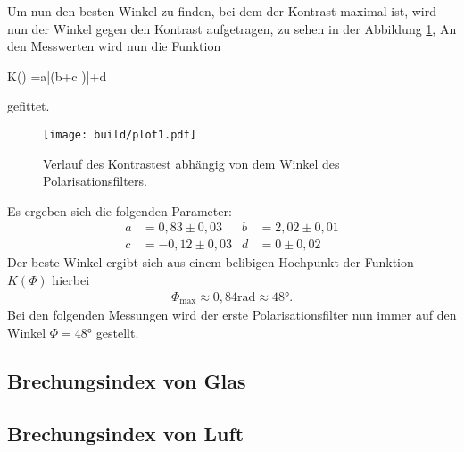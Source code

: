 Um nun den besten Winkel zu finden, bei dem der Kontrast maximal ist, wird
nun der Winkel gegen den Kontrast aufgetragen, zu sehen in der Abbildung \ref{fig:kontrast},
An den Messwerten wird nun die Funktion
\begin{algin}
  K\left(\Phi\right) =a\cdot \left|\sin\left(b\codt\Phi+c \right)\right|+d
\end{algin}
gefittet.

\begin{figure}
    \centering
    \texttt{[image: build/plot1.pdf]}
    \caption{Verlauf des Kontrastest abhängig von dem Winkel des Polarisationsfilters.}
    \label{fig:kontrast}
\end{figure}

Es ergeben sich die folgenden Parameter:
\begin{align*}
  a&=0,83\pm0,03
  &b&=2,02\pm0,01\\
  c&=-0,12\pm0,03
  &d&=0\pm0,02
\end{align*}
Der beste Winkel ergibt sich aus einem belibigen
Hochpunkt der Funktion $K(\Phi)$ hierbei
\begin{align*}
 \Phi_\mathrm{max}\approx0,84\si{\radian}\approx48\si{\degree}.
\end{align*}
Bei den folgenden Messungen wird der erste Polarisationsfilter
nun immer auf den Winkel $\Phi=48\si{\degree}$ gestellt.
\subsection{Brechungsindex von Glas}



\subsection{Brechungsindex von Luft}
